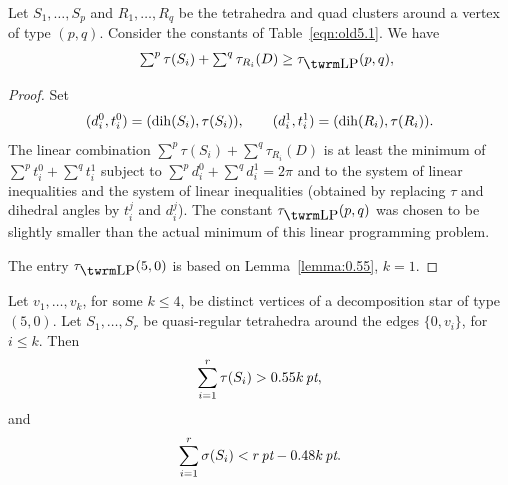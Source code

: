 \begin{lemma}
    \label{lemma:pq}
Let $S_1,\ldots,S_p$ and $R_1,\ldots,R_q$ be the tetrahedra and
quad clusters around a vertex of type $(p,q)$. Consider the
constants of Table~\ref{eqn:old5.1}.  We have
    $$
    \begin{array}{lll}
    &\sum^p\tau(S_i) + \sum^q\tau_{R_i}(D) \ge \tlp(p,q),\\
    \end{array}
    $$
\end{lemma}

\begin{proof} Set
    $$
    (d_i^0,t_i^0)=(\operatorname{dih}(S_i),\tau(S_i)),\qquad
    (d_i^1,t_i^1)=(\operatorname{dih}(R_i),\tau(R_i)).
    $$
The linear combination $\sum^p\tau(S_i)+\sum^q\tau_{R_i}(D)$ is at
least the minimum of $\sum^p t_i^0+\sum^q t_i^1$ subject to
$\sum^p d_i^0+\sum^q d_i^1 = 2\pi$ and to the system of linear
inequalities  and the system of linear
inequalities  (obtained by replacing $\tau$ and
dihedral angles by $t_i^j$ and $d_i^j$). The constant $\tlp(p,q)$
was chosen to be slightly smaller than the actual minimum of this
linear programming problem.

The entry $\tlp(5,0)$ is based on Lemma~\ref{lemma:0.55}, $k=1$.
\end{proof}


\begin{lemma}
    \label{lemma:0.55}
Let $v_1,\ldots, v_k$, for some $k\le 4$, be distinct vertices of
a decomposition star of type $(5,0)$.  Let $S_1,\ldots, S_r$ be
quasi-regular tetrahedra around the edges $\{0,v_i\}$, for $i\le k$.
Then
    $$\sum_{i=1}^r \tau(S_i)> 0.55k\,\hbox{\it pt},$$
and
    $$\sum_{i=1}^r \sigma(S_i) < r\,\hbox{\it pt} - 0.48k\,\hbox{\it pt}.$$
\end{lemma}


